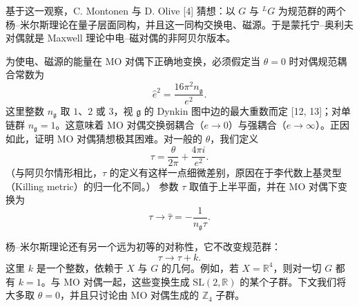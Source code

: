 \documentclass[11pt,a4paper,UTF8]{ctexart}
\begin{document}
基于这一观察，C. Montonen 与 D. Olive [4] 猜想：以 $G$ 与 ${}^{L}G$ 为规范群的两个杨–米尔斯理论在量子层面同构，并且这一同构交换电、磁源。于是蒙托宁–奥利夫对偶就是 Maxwell 理论中电–磁对偶的非阿贝尔版本。

为使电、磁源的能量在 MO 对偶下正确地变换，必须假定当 $\theta=0$ 时对偶规范耦合常数为
\begin{equation}
    \hat{e}^{2}=\frac{16\pi^{2}n_{\mathfrak{g}}}{e^{2}}. \tag{3}
\end{equation}
这里整数 $n_{\mathfrak{g}}$ 取 $1$、$2$ 或 $3$，视 $\mathfrak{g}$ 的 Dynkin 图中边的最大重数而定 [12, 13]；对单链群 $n_{\mathfrak{g}}=1$。这意味着 MO 对偶交换弱耦合（$e\to 0$）与强耦合（$e\to\infty$）。正因如此，证明 MO 对偶猜想极其困难。对一般的 $\theta$，我们定义
\[
    \tau=\frac{\theta}{2\pi}+\frac{4\pi i}{e^{2}}.
\]
（与阿贝尔情形相比，$\tau$ 的定义有这样一点细微差别，原因在于李代数上基灵型（Killing metric）的归一化不同。）
参数 $\tau$ 取值于上半平面，并在 MO 对偶下变换为
\begin{equation}
    \tau\to\hat{\tau}=-\frac{1}{n_{\mathfrak{g}}\tau}. \tag{4}
\end{equation}

杨–米尔斯理论还有另一个远为初等的对称性，它不改变规范群：
\[
    \tau\to\tau+k.
\]
这里 $k$ 是一个整数，依赖于 $X$ 与 $G$ 的几何。例如，若 $X=\mathbb{R}^{4}$，则对一切 $G$ 都有 $k=1$。与 MO 对偶一起，这些变换生成 $\mathrm{SL}(2,\mathbb{R})$ 的某个子群。下文我们将大多取 $\theta=0$，并且只讨论由 MO 对偶生成的 $\mathbb{Z}_{4}$ 子群。
\end{document}
